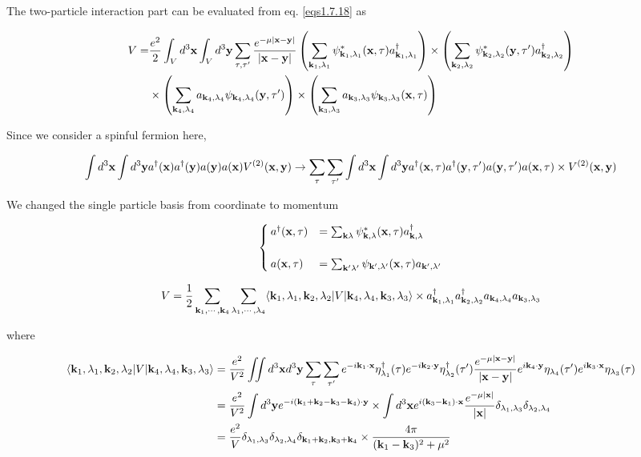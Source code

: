 The two-particle interaction part can be evaluated from eq. \eqref{eqs1.7.18} as

\[\begin{split}
V=&\frac{e^2}{2}\int_V d^3{\bf x}\int_V d^3{\bf y}\sum_{\tau,\tau'}\frac{e^{-\mu|\bf x-y|}}{|\bf x-y|}\left( \sum_{{\bf k}_1,\lambda_1}\psi^*_{{\bf k}_1,\lambda_1}({\bf x},\tau)a_{{\bf k}_1,\lambda_1}^\dagger\right)\times\left( \sum_{{\bf k}_2,\lambda_2}\psi^*_{{\bf k}_2,\lambda_2}({\bf y},\tau')a_{{\bf k}_2,\lambda_2}^\dagger\right)\\
&\times\left( \sum_{{\bf k}_4,\lambda_4}a_{{\bf k}_4,\lambda_4}\psi_{{\bf k}_4,\lambda_4}({\bf y},\tau')\right)\times\left( \sum_{{\bf k}_3,\lambda_3}a_{{\bf k}_3,\lambda_3}\psi_{{\bf k}_3,\lambda_3}({\bf x},\tau)\right)
\end{split}\]

Since we consider a spinful fermion here, 

\[\int d^3{\bf x}\int d^3{\bf y}a^\dagger({\bf x})a^\dagger({\bf y})a({\bf y})a({\bf x})V^{(2)}({\bf x,y})\to\sum_\tau \sum_{\tau'}\int d^3{\bf x}\int d^3{\bf y}a^\dagger({\bf x},\tau)a^\dagger({\bf y},\tau')a({\bf y},\tau')a({\bf x},\tau)\times V^{(2)}(\bf x,y)\]

We changed the single particle basis from coordinate to momentum

\[\begin{cases}
a^\dagger({\bf x},\tau)&=\sum_{{\bf k}\lambda}\psi_{{\bf k},\lambda}^*({\bf x},\tau)a^\dagger_{{\bf k},\lambda}\\
\ & \\
a({\bf x},\tau)&=\sum_{{\bf k'}\lambda'}\psi_{{\bf k'},\lambda'}({\bf x},\tau)a_{{\bf k'},\lambda'}
\end{cases}\]

\[V=\frac{1}{2}\sum_{{\bf k}_1,\cdots,{\bf k}_4}\sum_{\lambda_1,\cdots,\lambda_4}\langle{\bf k}_1,\lambda_1,{\bf k}_2,\lambda_2|V|{\bf k}_4,\lambda_4,{\bf k}_3,\lambda_3\rangle\times a^\dagger_{{\bf k}_1,\lambda_1}a^\dagger_{{\bf k}_2,\lambda_2}a_{{\bf k}_4,\lambda_4}a_{{\bf k}_3,\lambda_3}\]

where

\[\begin{split}
\langle{\bf k}_1,\lambda_1,{\bf k}_2,\lambda_2|V|{\bf k}_4,\lambda_4,{\bf k}_3,\lambda_3\rangle &=\frac{e^2}{V^2}\iint d^3{\bf x}d^3{\bf y}\sum_{\tau}\sum_{\tau'}e^{-i{\bf k}_1\cdot\bf x}\eta_{\lambda_1}^\dagger(\tau)e^{-i{\bf k}_2\cdot\bf y}\eta_{\lambda_2}^\dagger(\tau')\frac{e^{-\mu|\bf x-y|}}{|\bf x-y|}e^{i{\bf k}_4\cdot\bf y}\eta_{\lambda_4}(\tau')e^{i{\bf k}_3\cdot\bf x}\eta_{\lambda_3}(\tau)\\
&=\frac{e^2}{V^2}\int d^3{\bf y}e^{-i({\bf k}_1 + {\bf k}_2 - {\bf k}_3 - {\bf k}_4)\cdot\bf y}\times\int d^3{\bf x}e^{i({\bf k}_3-{\bf k}_1)\cdot\bf x}\frac{e^{-\mu|\bf x|}}{|\bf x|}\delta_{\lambda_1,\lambda_3}\delta_{\lambda_2,\lambda_4}\\
&=\frac{e^2}{V}\delta_{\lambda_1,\lambda_3}\delta_{\lambda_2,\lambda_4}\delta_{{\bf k}_1 + {\bf k}_2,{\bf k}_3 + {\bf k}_4}\times\frac{4\pi}{({\bf k}_1 - {\bf k}_3)^2+\mu^2}
\end{split}\]

